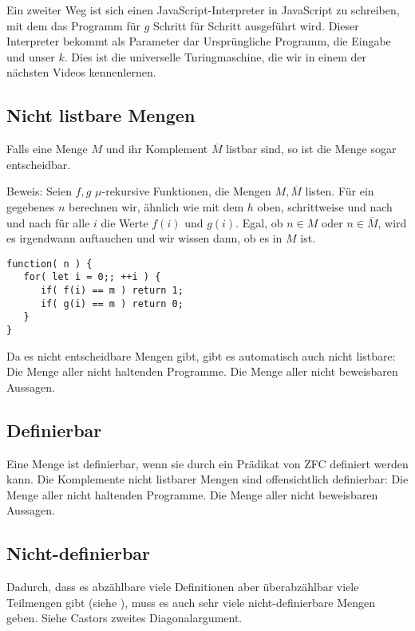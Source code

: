 \documentclass[a4paper]{amsart}
\theoremstyle{definition}
\begin{document}
Ein zweiter Weg ist sich einen JavaScript-Interpreter in JavaScript zu schreiben, mit dem das Programm für $g$ Schritt für Schritt ausgeführt wird. Dieser Interpreter bekommt als Parameter dar Ursprüngliche Programm, die Eingabe und unser $k$. Dies ist die universelle Turingmaschine, die wir in einem der nächsten Videos kennenlernen.

\subsection{Nicht listbare Mengen}
Falls eine Menge $M$ und ihr Komplement $\overline M$ listbar sind, so ist die Menge sogar entscheidbar.

Beweis: Seien $f,g$ $\mu$-rekursive Funktionen, die Mengen $M, \overline M$ listen. Für ein gegebenes $n$ berechnen wir, ähnlich wie mit dem $h$ oben, schrittweise und nach und nach für alle $i$ die Werte $f(i)$ und $g(i)$. Egal, ob $n \in M$ oder $n \in \overline M$, wird es irgendwann auftauchen und wir wissen dann, ob es in $M$ ist.
\begin{lstlisting}
function( n ) {
   for( let i = 0;; ++i ) {
      if( f(i) == m ) return 1;
      if( g(i) == m ) return 0;
   }
}
\end{lstlisting}

Da es nicht entscheidbare Mengen gibt, gibt es automatisch auch nicht listbare: Die Menge aller nicht haltenden Programme. Die Menge aller nicht beweisbaren Aussagen.

\subsection{Definierbar}
Eine Menge ist definierbar, wenn sie durch ein Prädikat von ZFC definiert werden kann. Die Komplemente nicht listbarer Mengen sind offensichtlich definierbar: Die Menge aller nicht haltenden Programme. Die Menge aller nicht beweisbaren Aussagen.

\subsection{Nicht-definierbar}
Dadurch, dass es abzählbare viele Definitionen aber überabzählbar viele Teilmengen gibt (siehe ), muss es auch sehr viele nicht-definierbare Mengen geben. Siehe Castors zweites Diagonalargument.
\end{document}
